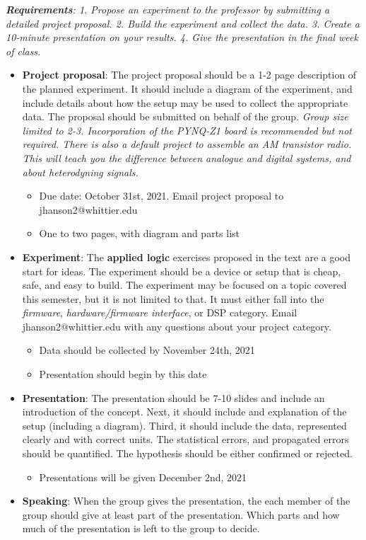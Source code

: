 \documentclass[10pt]{article}
\begin{document}
\maketitle

\noindent
\textit{\textbf{Requirements}: 1. Propose an experiment to the professor by submitting a detailed project proposal.  2. Build the experiment and collect the data.  3. Create a 10-minute presentation on your results.  4. Give the presentation in the final week of class.} \\
\begin{itemize}
\item\textbf{ Project proposal}: The project proposal should be a 1-2 page description of the planned experiment.  It should include a diagram of the experiment, and include details about how the setup may be used to collect the appropriate data.  The proposal should be submitted on behalf of the group.  \textit{Group size limited to 2-3.  Incorporation of the PYNQ-Z1 board is recommended but not required.  There is also a default project to assemble an AM transistor radio.  This will teach you the difference between analogue and digital systems, and about heterodyning signals.}
\begin{itemize}
\item Due date: October 31st, 2021.  Email project proposal to jhanson2@whittier.edu
\item One to two pages, with diagram and parts list
\end{itemize}
\item \textbf{Experiment}: The \textbf{applied logic} exercises proposed in the text are a good start for ideas.  The experiment should be a device or setup that is cheap, safe, and easy to build.  The experiment may be focused on a topic covered this semester, but it is not limited to that. It must either fall into the \textit{firmware}, \textit{hardware/firmware interface}, or DSP category.  Email jhanson2@whittier.edu with any questions about your project category.
\begin{itemize}
\item Data should be collected by November 24th, 2021
\item Presentation should begin by this date
\end{itemize}
\item \textbf{Presentation}: The presentation should be 7-10 slides and include an introduction of the concept.  Next, it should include and explanation of the setup (including a diagram).  Third, it should include the data, represented clearly and with correct units.  The statistical errors, and propagated errors should be quantified.  The hypothesis should be either confirmed or rejected.
\begin{itemize}
\item Presentations will be given December 2nd, 2021
\end{itemize}
\item \textbf{Speaking}: When the group gives the presentation, the each member of the group should give at least part of the presentation.  Which parts and how much of the presentation is left to the group to decide.
\end{itemize}
\end{document}
